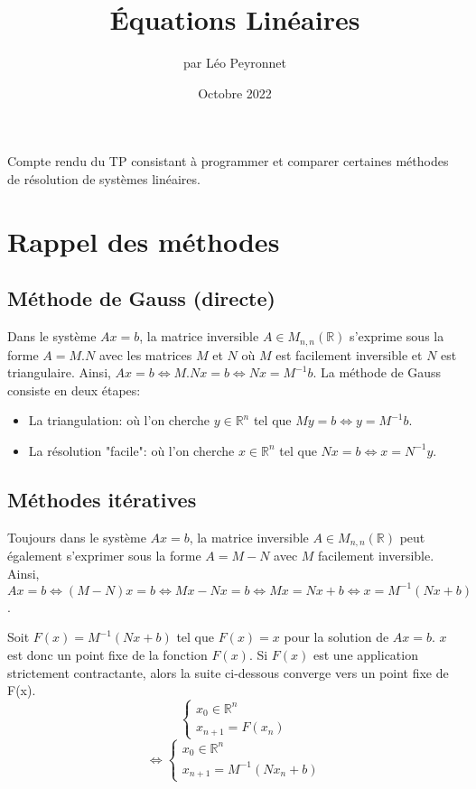 \documentclass[10pt,a4paper,french]{article}
\author{par Léo Peyronnet}
\title{Équations Linéaires}
\date{Octobre 2022}
\begin{document}
\maketitle
Compte rendu du TP consistant à programmer et comparer certaines méthodes de résolution de systèmes linéaires.
\section{Rappel des méthodes}
\subsection{Méthode de Gauss (directe)}
Dans le système $Ax = b$, la matrice inversible $A \in M_{n,n}(\mathbb{R})$ s'exprime sous la forme $A = M.N$ avec les matrices $M$ et $N$ où $M$ est facilement inversible et $N$ est triangulaire. Ainsi, $Ax = b \Leftrightarrow M.Nx = b \Leftrightarrow Nx = M^{-1}b$.
La méthode de Gauss consiste en deux étapes:
\begin{itemize}
\item La triangulation: où l'on cherche $y \in \mathbb{R}^n$ tel que $My=b \Leftrightarrow y=M^{-1}b$.
\item La résolution "facile": où l'on cherche $x \in \mathbb{R}^n$ tel que $Nx=b \Leftrightarrow x=N^{-1}y$.  
\end{itemize}
\subsection{Méthodes itératives}
Toujours dans le système $Ax = b$, la matrice inversible $A \in M_{n,n}(\mathbb{R})$ peut également s'exprimer sous la forme $A=M-N$ avec $M$ facilement inversible. Ainsi, $Ax = b \Leftrightarrow (M-N)x = b \Leftrightarrow Mx-Nx = b \Leftrightarrow Mx = Nx + b \Leftrightarrow x = M^{-1}(Nx + b)$.
 
Soit $F(x)=M^{-1}(Nx + b)$ tel que $F(x)=x$ pour la solution de $Ax=b$. $x$ est donc un point fixe de la fonction $F(x)$. Si $F(x)$ est une application strictement contractante, alors la suite ci-dessous converge vers un point fixe de F(x).
$$
\left\{
	\begin{array}{ll}
		x_0 \in \mathbb{R}^n \\
		x_{n+1}=F(x_n)
	\end{array}
\right.
$$
$$
\Leftrightarrow\left\{
	\begin{array}{ll}
		x_0 \in \mathbb{R}^n \\
		x_{n+1}=M^{-1}(Nx_n+b)
	\end{array}
\right.
$$
\end{document}
